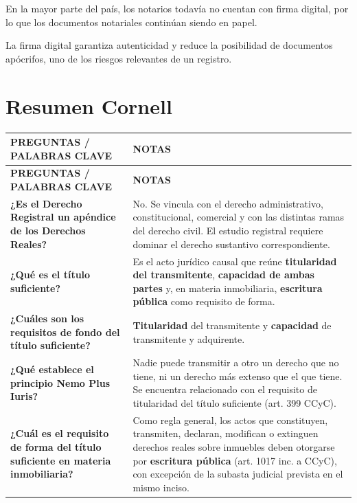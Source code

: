 \documentclass[12pt,oneside]{book}
\begin{document}
En la mayor parte del país, los notarios todavía no cuentan con firma digital, por lo que los documentos notariales continúan siendo en papel.

La firma digital garantiza autenticidad y reduce la posibilidad de documentos apócrifos, uno de los riesgos relevantes de un registro.

\chapter{Resumen Cornell}

\renewcommand{\arraystretch}{1.25}
\setlength{\tabcolsep}{6pt}

\begin{longtable}{|>{\raggedright\arraybackslash}p{}|>{\raggedright\arraybackslash}p{}|}
\hline
\textbf{PREGUNTAS / PALABRAS CLAVE} & \textbf{NOTAS} \\
\hline
\endfirsthead

\hline
\textbf{PREGUNTAS / PALABRAS CLAVE} & \textbf{NOTAS} \\
\hline
\endhead

\textbf{¿Es el Derecho Registral un apéndice de los Derechos Reales?} &
No. Se vincula con el derecho administrativo, constitucional, comercial y con las distintas ramas del derecho civil. El estudio registral requiere dominar el derecho sustantivo correspondiente. \\
\hline

\textbf{¿Qué es el título suficiente?} &
Es el acto jurídico causal que reúne \textbf{titularidad del transmitente}, \textbf{capacidad de ambas partes} y, en materia inmobiliaria, \textbf{escritura pública} como requisito de forma. \\
\hline

\textbf{¿Cuáles son los requisitos de fondo del título suficiente?} &
\textbf{Titularidad} del transmitente y \textbf{capacidad} de transmitente y adquirente. \\
\hline

\textbf{¿Qué establece el principio Nemo Plus Iuris?} &
Nadie puede transmitir a otro un derecho que no tiene, ni un derecho más extenso que el que tiene. Se encuentra relacionado con el requisito de titularidad del título suficiente (art. 399 CCyC). \\
\hline

\textbf{¿Cuál es el requisito de forma del título suficiente en materia inmobiliaria?} &
Como regla general, los actos que constituyen, transmiten, declaran, modifican o extinguen derechos reales sobre inmuebles deben otorgarse por \textbf{escritura pública} (art. 1017 inc. a CCyC), con excepción de la subasta judicial prevista en el mismo inciso. \\
\hline


\end{longtable}
\end{document}
